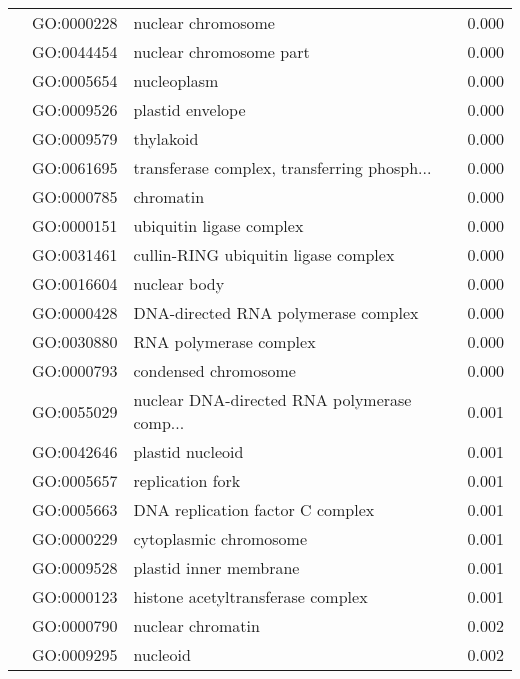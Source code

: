 \begin{longtable}{lllr}
   & GO:0000228 &                           nuclear chromosome &         0.000 \\
   & GO:0044454 &                      nuclear chromosome part &         0.000 \\
   & GO:0005654 &                                  nucleoplasm &         0.000 \\
   & GO:0009526 &                             plastid envelope &         0.000 \\
   & GO:0009579 &                                    thylakoid &         0.000 \\
   & GO:0061695 &  transferase complex, transferring phosph... &         0.000 \\
   & GO:0000785 &                                    chromatin &         0.000 \\
   & GO:0000151 &                     ubiquitin ligase complex &         0.000 \\
   & GO:0031461 &         cullin-RING ubiquitin ligase complex &         0.000 \\
   & GO:0016604 &                                 nuclear body &         0.000 \\
   & GO:0000428 &          DNA-directed RNA polymerase complex &         0.000 \\
   & GO:0030880 &                       RNA polymerase complex &         0.000 \\
   & GO:0000793 &                         condensed chromosome &         0.000 \\
   & GO:0055029 &  nuclear DNA-directed RNA polymerase comp... &         0.001 \\
   & GO:0042646 &                             plastid nucleoid &         0.001 \\
   & GO:0005657 &                             replication fork &         0.001 \\
   & GO:0005663 &             DNA replication factor C complex &         0.001 \\
   & GO:0000229 &                       cytoplasmic chromosome &         0.001 \\
   & GO:0009528 &                       plastid inner membrane &         0.001 \\
   & GO:0000123 &            histone acetyltransferase complex &         0.001 \\
   & GO:0000790 &                            nuclear chromatin &         0.002 \\
   & GO:0009295 &                                     nucleoid &         0.002 \\

\end{longtable}
